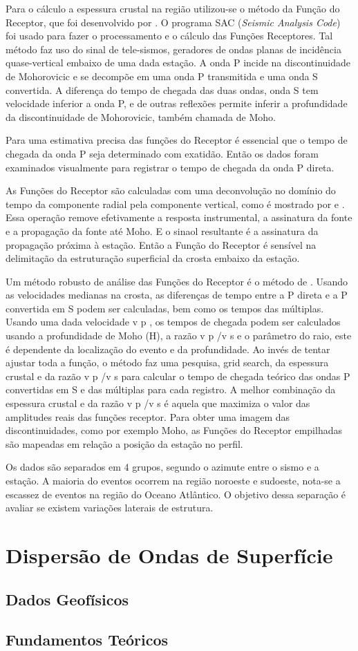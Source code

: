Para o cálculo a espessura crustal na região utilizou-se o método da Função do Receptor, que foi desenvolvido por \cite{Langston_1977}. O programa SAC (\textit{Seismic Analysis Code}) foi usado para fazer o processamento e o cálculo das Funções Receptores. Tal método faz uso do sinal de tele-sismos, geradores de ondas planas de incidência quase-vertical embaixo de uma dada estação. A onda P incide na discontinuidade de Mohorovicic e se decompõe em uma onda P transmitida e uma onda S convertida. A diferença do tempo de chegada das duas ondas, onda S tem velocidade inferior a onda P, e de outras reflexões permite inferir a profundidade da discontinuidade de Mohorovicic, também chamada de Moho.

Para uma estimativa precisa das funções do Receptor é essencial que o tempo de chegada da onda P seja determinado com exatidão. Então os dados foram examinados visualmente para registrar o tempo de chegada da onda P direta. 

As Funções do Receptor são calculadas com uma deconvolução no domínio do tempo da componente radial pela componente vertical, como é mostrado por \citep{Langston_1977} e \citep{ammon_isolation_1991}. Essa operação remove efetivamente a resposta instrumental, a assinatura da fonte e a propagação da fonte até Moho. E o sinaol resultante é a assinatura da propagação próxima à estação. Então a Função do Receptor é sensível na delimitação da estruturação superficial da crosta embaixo da estação.

Um método robusto de análise das Funções do Receptor é o método de \citep{Zhu_Kanamori_2000}. Usando as velocidades medianas na crosta, as diferenças de tempo entre a P direta e a P convertida em S podem ser calculadas, bem como os tempos das múltiplas. Usando uma dada velocidade v p , os tempos de chegada podem ser calculados usando a profundidade de Moho (H), a razão v p /v s e o parâmetro do raio, este é dependente da localização do evento e da profundidade. Ao invés de tentar ajustar toda a função, o método faz uma pesquisa, grid search, da espessura crustal e da razão v p /v s para calcular o tempo de chegada teórico das ondas P convertidas em S e das múltiplas para cada registro. A melhor combinação da espessura crustal e da razão v p /v s é aquela que maximiza o valor das amplitudes reais das funções receptor. Para obter uma imagem das discontinuidades, como por exemplo Moho, as Funções do Receptor empilhadas são mapeadas em relação a posição da estação no perfil. 

Os dados são separados em 4 grupos, segundo o azimute entre o sismo e a estação. A maioria do eventos ocorrem na região noroeste e sudoeste, nota-se a escassez de eventos na região do Oceano Atlântico. O objetivo dessa separação é avaliar se existem variações laterais de estrutura.


\section*{Dispersão de Ondas de Superfície}
\subsection*{Dados Geofísicos}
\subsection*{Fundamentos Teóricos}